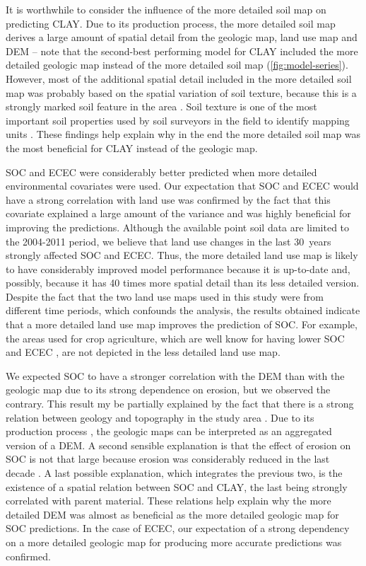 It is worthwhile to consider the influence of the more detailed soil map on predicting CLAY. Due to its 
production process, the more detailed soil map derives a large amount of spatial detail from the geologic map, 
land use map and DEM -- note that the second-best performing model for CLAY included the more detailed geologic 
map instead of the more detailed soil map (\autoref{fig:model-series}). However, most of the additional spatial 
detail included in the more detailed soil map was probably based on the spatial variation of soil texture, 
because this is a strongly marked soil feature in the area \cite{MiguelEtAl2012}. Soil texture is one of the 
most important soil properties used by soil surveyors in the field to identify mapping units \cite{Legros2006}. 
These findings help explain why in the end the more detailed soil map was the most beneficial for CLAY instead 
of the geologic map.

SOC and ECEC were considerably better predicted when more detailed environmental covariates were used. Our 
expectation that SOC and ECEC would have a strong correlation with land use was confirmed by the fact that this 
covariate explained a large amount of the variance and was highly beneficial for improving the predictions. 
Although the available point soil data are limited to the 2004-2011 period, we believe that land use changes in 
the last 30~years \cite{MiguelEtAl2012, TenCatenEtAl2012b} strongly affected SOC and ECEC. Thus, 
the more detailed land use map is likely to have considerably improved model performance because it is 
up-to-date and, possibly, because it has 40 times more spatial detail than its less detailed version. Despite 
the fact that the two land use maps used in this study were from different time periods, which confounds the 
analysis, the results obtained indicate that a more detailed land use map improves the prediction of SOC. For 
example, the areas used for crop agriculture, which are well know for having lower SOC and ECEC 
\cite{Menezes2008, MouraBueno2012}, are not depicted in the less detailed land use map.

We expected SOC to have a stronger correlation with the DEM than with the geologic map due to its strong 
dependence on erosion, but we observed the contrary. This result my be partially explained by the fact that 
there is a strong relation between geology and topography in the study area \cite{Sartori2009}. Due to its 
production process \cite{MacielFilho1990}, the geologic maps can be interpreted as an aggregated version of a 
DEM. A second sensible explanation is that the effect of erosion on SOC is not that large because erosion was 
considerably reduced in the last decade \cite{MiguelEtAl2012, TenCatenEtAl2012b}. A last possible explanation, 
which integrates the previous two, is the existence of a spatial relation between SOC and CLAY, the last being 
strongly correlated with parent material. These relations help explain why the more detailed DEM was almost as 
beneficial as the more detailed geologic map for SOC predictions. In the case of ECEC, our expectation of a 
strong dependency on a more detailed geologic map for producing more accurate predictions was confirmed.

